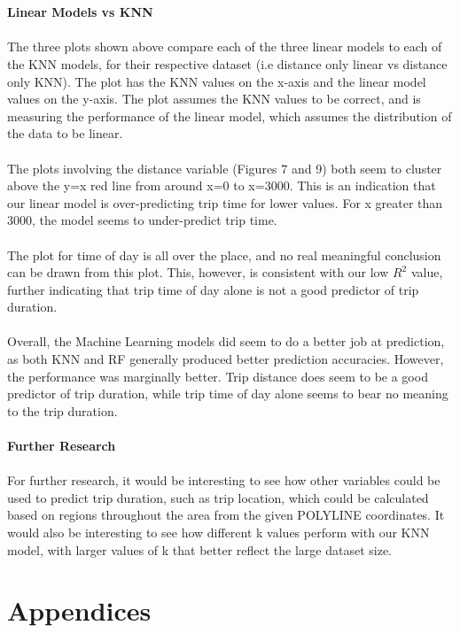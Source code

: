 \documentclass[letterpaper, 12 pt, conference]{article}
\begin{document}
\\
\\\textbf{Linear Models vs KNN}
\\
\\The three plots shown above compare each of the three linear models to each of the KNN models, for their respective dataset (i.e distance only linear vs distance only KNN). The plot has the KNN values on the x-axis and the linear model values on the y-axis. The plot assumes the KNN values to be correct, and is measuring the performance of the linear model, which assumes the distribution of the data to be linear. 
\\
\\The plots involving the distance variable (Figures 7 and 9) both seem to cluster above the y=x red line from around x=0 to x=3000. This is an indication that our linear model is over-predicting trip time for lower values. For x greater than 3000, the model seems to under-predict trip time.  
\\
\\The plot for time of day is all over the place, and no real meaningful conclusion can be drawn from this plot. This, however, is consistent with our low $R^2$ value, further indicating that trip time of day alone is not a good predictor of trip duration. 
\\
\\Overall, the Machine Learning models did seem to do a better job at prediction, as both KNN and RF generally produced better prediction accuracies. However, the performance was marginally better. Trip distance does seem to be a good predictor of trip duration, while trip time of day alone seems to bear no meaning to the trip duration. 
\\
\\\textbf{Further Research}
\\
\\For further research, it would be interesting to see how other variables could be used to predict trip duration, such as trip location, which could be calculated based on regions throughout the area from the given POLYLINE coordinates. It would also be interesting to see how different k values perform with our KNN model, with larger values of k that better reflect the large dataset size. 
\\

\appendix
\section{Appendices}
\end{document}
